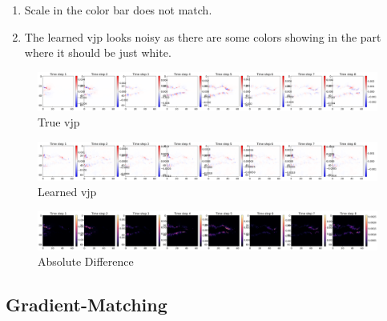 \documentclass[
]{article}
\providecommand{\tightlist}{%
  \setlength{\itemsep}{0pt}\setlength{\parskip}{0pt}}\usepackage{longtable,booktabs,array}
\begin{document}
\begin{enumerate}
\def\labelenumi{\arabic{enumi}.}
\tightlist
\item
  Scale in the color bar does not match.
\item
  The learned vjp looks noisy as there are some colors showing in the
  part where it should be just white.
\end{enumerate}

\begin{figure}[H]

{\centering \includegraphics[width=1\textwidth,height=\textheight]{../../plot/GCS_channel_plot/training/MSE/true_vjp_1.png}

}

\caption{True vjp}

\end{figure}%
\begin{figure}[H]

{\centering \includegraphics[width=1\textwidth,height=\textheight]{../../plot/GCS_channel_plot/training/MSE/learned_vjp_990.png}

}

\caption{Learned vjp}

\end{figure}%
\begin{figure}[H]

{\centering \includegraphics[width=1\textwidth,height=\textheight]{../../plot/GCS_channel_plot/training/MSE/diff_vjp_990.png}

}

\caption{Absolute Difference}

\end{figure}%

\subsection{Gradient-Matching}\label{gradient-matching}
\end{document}
